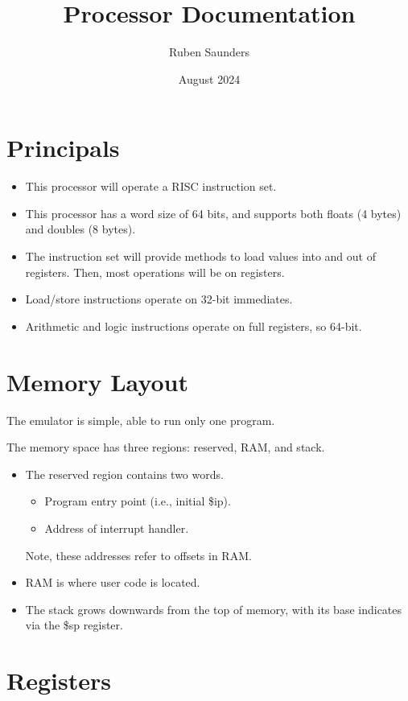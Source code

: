 \documentclass[10pt]{article}
\title{Processor Documentation}
\author{Ruben Saunders}
\date{August 2024}
\begin{document}
\maketitle
\tableofcontents

\newpage

\section{Principals}

\begin{itemize}
    \item This processor will operate a RISC instruction set.
    \item This processor has a word size of 64 bits, and supports both floats (4 bytes) and doubles (8 bytes).
    \item The instruction set will provide methods to load values into and out of registers.
    Then, most operations will be on registers.
    \item Load/store instructions operate on 32-bit immediates.
    \item Arithmetic and logic instructions operate on full registers, so 64-bit.
\end{itemize}

\section{Memory Layout}

The emulator is simple, able to run only one program.

The memory space has three regions: reserved, RAM, and stack.
\begin{itemize}
    \item The reserved region contains two words.
    \begin{itemize}
        \item Program entry point (i.e., initial \$ip).
        \item Address of interrupt handler.
    \end{itemize}
    Note, these addresses refer to offsets in RAM.
    \item RAM is where user code is located.
    \item The stack grows downwards from the top of memory, with its base indicates via the \$sp register.
\end{itemize}

\section{Registers}
\end{document}
